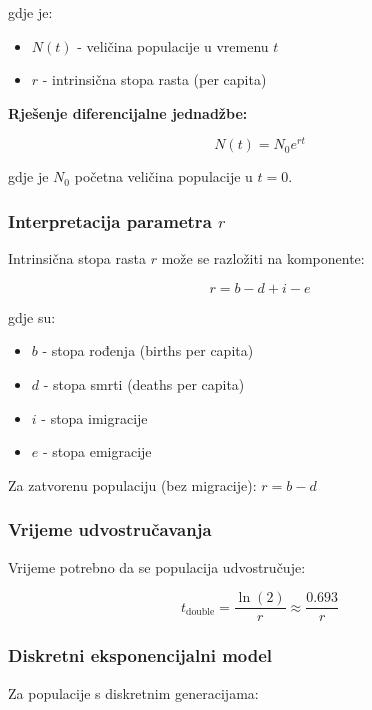 \documentclass[11pt,oneside]{book}
\begin{document}
gdje je:
\begin{itemize}
	\item $N(t)$ - veličina populacije u vremenu $t$
	\item $r$ - intrinsična stopa rasta (per capita)
\end{itemize}

\textbf{Rješenje diferencijalne jednadžbe:}

\begin{equation}
	N(t) = N_0 e^{rt}
\end{equation}

gdje je $N_0$ početna veličina populacije u $t = 0$.

\subsubsection{Interpretacija parametra $r$}

Intrinsična stopa rasta $r$ može se razložiti na komponente:

\begin{equation}
	r = b - d + i - e
\end{equation}

gdje su:
\begin{itemize}
	\item $b$ - stopa rođenja (births per capita)
	\item $d$ - stopa smrti (deaths per capita)  
	\item $i$ - stopa imigracije
	\item $e$ - stopa emigracije
\end{itemize}

Za zatvorenu populaciju (bez migracije): $r = b - d$

\subsubsection{Vrijeme udvostručavanja}

Vrijeme potrebno da se populacija udvostručuje:

\begin{equation}
	t_{\text{double}} = \frac{\ln(2)}{r} \approx \frac{0.693}{r}
\end{equation}

\subsubsection{Diskretni eksponencijalni model}

Za populacije s diskretnim generacijama:
\end{document}
